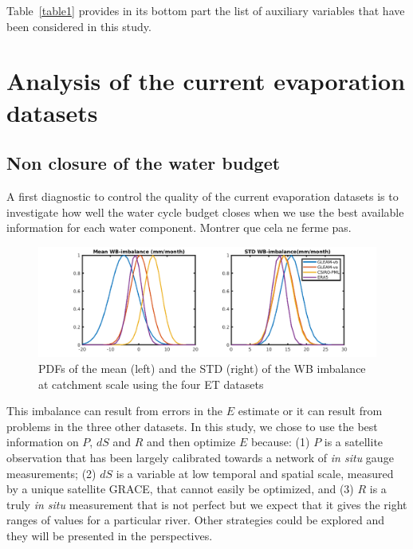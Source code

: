 \documentclass[draft]{agujournal2019}
\begin{document}
Table~\ref{table1} provides in its bottom part the list of auxiliary variables that have been considered in this study.


\section{Analysis of the current evaporation datasets}

\subsection{Non closure of the water budget}
A first diagnostic to control the quality of the current evaporation datasets is to investigate how well the water cycle budget closes when we use the best available information for each water component. 
Montrer que cela ne ferme pas.

\begin{figure}[h]
\centering
\includegraphics[width=\textwidth]{m_std_imb}
\caption{PDFs of the mean (left) and the STD (right) of the WB imbalance at catchment scale using the four ET datasets}
\end{figure}

This imbalance can result from errors in the $E$ estimate or it can result from problems in the three other datasets. 
In this study, we chose to use the best information on $P$, $dS$ and $R$ and then optimize $E$ because: 
(1) $P$ is a satellite observation that has been largely calibrated towards a network of {\it in situ} gauge measurements; 
(2) $dS$ is a variable at low temporal and spatial scale, measured by a unique satellite GRACE, that cannot easily be optimized, 
and (3) $R$ is a truly {\it in situ} measurement that is not perfect but we expect that it gives the right ranges of values for a particular river. 
Other strategies could be explored and they will be presented in the perspectives. 
\end{document}
